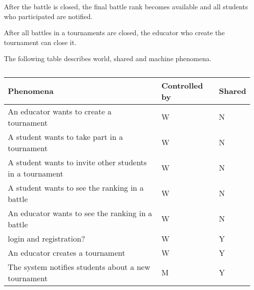 After the battle is closed, the final battle rank becomes available and all students who participated are notified.

After all battles in a tournaments are closed, the educator who create the tournament can close it.

The following table describes world, shared and machine phenomena.
\begin{center} %
    \begin{longtable}{|p{8.7cm}|p{3cm}|p{3cm}|}
        \caption[Phenomena Table]{}
        \label{table:phenomena}
        \endlastfoot
        \hline
        \rowcolor{gray!50}
        \textbf{Phenomena}                                                                                                                    & \textbf{Controlled by} & \textbf{Shared} \\ \hline
        An educator wants to create a tournament                                                                                              & W                      & N               \\ \hline
        A student wants to take part in a tournament                                                                                          & W                      & N               \\ \hline
        A student wants to invite other students in a tournament                                                                              & W                      & N               \\ \hline
        A student wants to see the ranking in a battle                                                                                        & W                      & N               \\ \hline
        An educator wants to see the ranking in a battle                                                                                      & W                      & N               \\ \hline
        login and registration?                                                                                                               & W                      & Y               \\ \hline
        An educator creates a tournament                                                                                                      & W                      & Y               \\ \hline
        The system notifies students about a new tournament                                                                                   & M                      & Y               \\ \hline

\end{longtable}
\end{center}
